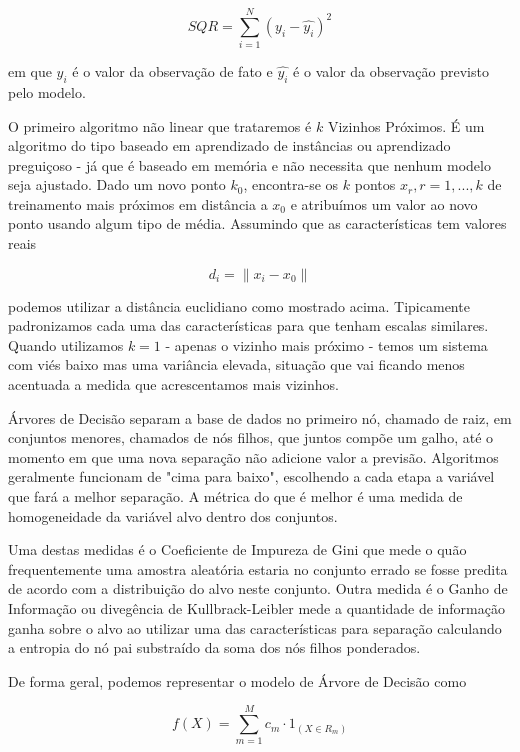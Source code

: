 \documentclass[twocolumn]{rbef}
\newcommand{\1}{\mathbbm{1}}
\begin{document}
\begin{equation}
    SQR = \sum_{i=1}^{N} (y_{i} - \hat{y_{i}})^{2}
\end{equation}

em que $y_{i}$ é o valor da observação de fato e $\hat{y_{i}}$ é o valor da observação previsto pelo modelo.

O primeiro algoritmo não linear que trataremos é $k$ Vizinhos Próximos. É um algoritmo do tipo baseado em aprendizado de instâncias ou aprendizado preguiçoso - já que é baseado em memória e não necessita que nenhum modelo seja ajustado. Dado um novo ponto $k_{0}$, encontra-se os $k$ pontos $x_{r}, r=1,...,k$ de treinamento mais próximos em distância a $x_{0}$ e atribuímos um valor ao novo ponto usando algum tipo de média. Assumindo que as características tem valores reais\cite{Hastie}

\begin{equation}
    d_{i} = \| x_{i} - x_{0} \|
\end{equation}

podemos utilizar a distância euclidiano como mostrado acima. Tipicamente padronizamos cada uma das características para que tenham escalas similares. Quando utilizamos $k=1$ - apenas o vizinho mais próximo - temos um sistema com viés baixo mas uma variância elevada, situação que vai ficando menos acentuada a medida que acrescentamos mais vizinhos.

Árvores de Decisão separam a base de dados no primeiro nó, chamado de raiz, em conjuntos menores, chamados de nós filhos, que juntos compõe um galho, até o momento em que uma nova separação não adicione valor a previsão. Algoritmos geralmente funcionam de "cima para baixo", escolhendo a cada etapa a variável que fará a melhor separação. A métrica do que é melhor é uma medida de homogeneidade da variável alvo dentro dos conjuntos.

Uma destas medidas é o Coeficiente de Impureza de Gini que mede o quão frequentemente uma amostra aleatória estaria no conjunto errado se fosse predita de acordo com a distribuição do alvo neste conjunto. Outra medida é o Ganho de Informação ou divegência de Kullbrack-Leibler\cite{Kullbrack} mede a quantidade de informação ganha sobre o alvo ao utilizar uma das características para separação calculando a entropia do nó pai substraído da soma dos nós filhos ponderados.

De forma geral, podemos representar o modelo de Árvore de Decisão como\cite{James}

\begin{equation}
    f(X) = \sum_{m=1}^{M} c_{m} \cdot 1_{(X \in R_{m})}
\end{equation}
\end{document}
